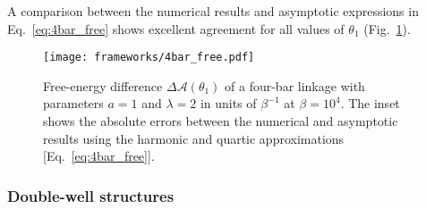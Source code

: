 A comparison between the numerical results and asymptotic expressions in Eq.~\eqref{eq:4bar_free} shows excellent agreement for all values of $\theta_{1}$ (Fig.~\ref{fig:4bar_free}).
%
\begin{figure}
  \begin{center}
    \texttt{[image: frameworks/4bar\_free.pdf]}
  \end{center}
  \caption{Free-energy difference $\Delta\mathscr{A}(\theta_1)$ of a four-bar linkage with parameters $a=1$ and $\lambda=2$ in units of $\beta^{-1}$ at $\beta = 10^{4}$.
  The inset shows the absolute errors between the numerical and asymptotic results using the harmonic and quartic approximations [Eq.~\eqref{eq:4bar_free}].}
  \label{fig:4bar_free}
\end{figure}

\subsubsection*{Double-well structures}

